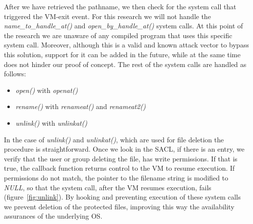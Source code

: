 \par After we have retrieved the pathname, we then check for the system call that triggered the VM-exit event. For this research we will not handle the \textit{name\_to\_handle\_at()} and \textit{open\_by\_handle\_at()} system calls. At this point of the research we are unaware of any compiled program that uses this specific system call. Moreover, although this is a valid and known attack vector to bypass this solution, support for it can be added in the future, while at the same time does not hinder our proof of concept. The rest of the system calls are handled as follows: 
\begin{itemize}
	\item \textit{open()} with \textit{openat()}
	\item \textit{rename()} with \textit{renameat()} and \textit{renameat2()}
	\item \textit{unlink()} with \textit{unlinkat()}
\end{itemize}

\par In the case of \textit{unlink()} and \textit{unlinkat()}, which are used for file deletion the procedure is straightforward. Once we look in the \ac{SACL}, if there is an entry, we verify that the user or group deleting the file, has write permissions. If that is true, the callback function returns control to the \ac{VM} to resume execution. If permissions do not match, the pointer to the filename string is modified to \textit{NULL}, so that the system call, after the \ac{VM} resumes execution, fails (figure~\ref{fig:unlink}). By hooking and preventing execution of these system calls we prevent deletion of the protected files, improving this way the availability assurances of the underlying \ac{OS}.

